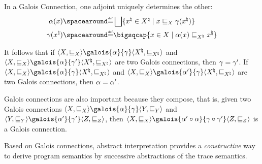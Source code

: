 \begin{remark}
  In a Galois Connection, one adjoint uniquely determines the other:
  \begin{align*}
    \abstraction(x) &\DefeQ \bigjoin \setdef{{x^\natural} \in {X^\natural}}{x \sqsubseteq_X \concretization({x^\natural})} \\
    \concretization({x^\natural}) &\DefeQ \bigmeet \setdef{x \in X}{\abstraction(x) \sqsubseteq_{X^\natural} {x^\natural}}
  \end{align*}
\end{remark}


It follows that if $\tuple{X}{\sqsubseteq_X}\galois{\abstraction}{\concretization}\tuple{{X^\natural}}{\sqsubseteq_{X^\natural}}$ and $\tuple{X}{\sqsubseteq_X}\galois{\abstraction}{\concretization'}\tuple{{X^\natural}}{\sqsubseteq_{X^\natural}}$ are two Galois connections, then $\gamma = \gamma'$. If $\tuple{X}{\sqsubseteq_X}\galois{\abstraction}{\concretization}\tuple{{X^\natural}}{\sqsubseteq_{X^\natural}}$ and $\tuple{X}{\sqsubseteq_X}\galois{\abstraction'}{\concretization}\tuple{{X^\natural}}{\sqsubseteq_{X^\natural}}$ are two Galois connections, then $\alpha = \alpha'$.

Galois connections are also important because they compose, that is, given two Galois connections $\tuple{X}{\sqsubseteq_X}\galois{\abstraction}{\concretization}\tuple{Y}{\sqsubseteq_Y}$ and $\tuple{Y}{\sqsubseteq_Y}\galois{\abstraction'}{\concretization'}\tuple{Z}{\sqsubseteq_Z}$, then $\tuple{X}{\sqsubseteq_X}\galois{\abstraction' \circ \abstraction}{\concretization \circ \concretization'}\tuple{Z}{\sqsubseteq_Z}$ is a Galois connection.

Based on Galois connections, abstract interpretation provides a \emph{constructive} way to derive program semantics by successive abstractions of the trace semantics.

